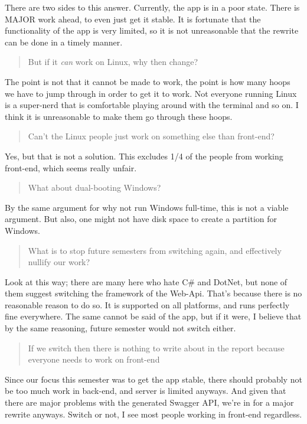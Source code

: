 There are two sides to this answer. Currently, the app is in a poor state. There is
MAJOR work ahead, to even just get it stable. It is fortunate that the
functionality of the app is very limited, so it is not unreasonable that
the rewrite can be done in a timely manner.

\begin{quote}
But if it \emph{can} work on Linux, why then change?
\end{quote}

The point is not that it cannot be made to work, the point is how many
hoops we have to jump through in order to get it to work. Not everyone
running Linux is a super-nerd that is comfortable playing around with
the terminal and so on. I think it is unreasonable to make them go
through these hoops.

\begin{quote}
Can't the Linux people just work on something else than front-end?
\end{quote}

Yes, but that is not a solution. This excludes 1/4 of the people from
working front-end, which seems really unfair.

\begin{quote}
What about dual-booting Windows?
\end{quote}

By the same argument for why not run Windows full-time, this is not a
viable argument. But also, one might not have disk space to create a
partition for Windows.

\begin{quote}
What is to stop future semesters from switching again, and effectively
nullify our work?
\end{quote}

Look at this way; there are many here who hate C\# and DotNet, but none
of them suggest switching the framework of the Web-Api. That's because
there is no reasonable reason to do so. It is supported on all
platforms, and runs perfectly fine everywhere. The same cannot be said
of the app, but if it were, I believe that by the same reasoning, future
semester would not switch either.

\begin{quote}
If we switch then there is nothing to write about in the report because
everyone needs to work on front-end
\end{quote}

Since our focus this semester was to get the app stable, there should
probably not be too much work in back-end, and server is limited
anyways. And given that there are major problems with the generated
Swagger API, we're in for a major rewrite anyways. Switch or not, I see
most people working in front-end regardless.


